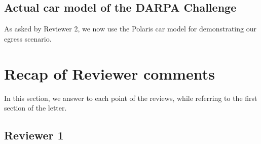 \documentclass[a4paper]{article}
\begin{document}
\subsection{Actual car model of the DARPA Challenge}
As asked by Reviewer 2, we now use the Polaris car model for demonstrating our egress scenario.

\newpage
\section{Recap of Reviewer comments}

In this section, we answer to each point of the reviews, while referring to the first section of the letter.

\subsection{Reviewer 1}
\noindent
\end{document}
